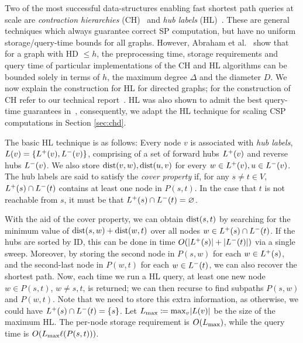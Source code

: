 Two of the most successful data-structures enabling fast shortest path queries at scale are \emph{contraction hierarchies} (CH)~\cite{geisberger_ch_definition} and \emph{hub labels} (HL)~\cite{cohen_definition_hl}.
These are general techniques which always guarantee correct SP computation, but have no uniform storage/query-time bounds for all graphs.
However, Abraham et al.~\cite{highway2013} show that for a graph with HD $\leq h$, the preprocessing time, storage requirements and query time of particular implementations of the CH and HL algorithms can be bounded solely in terms of $h$, the maximum degree $\Delta$ and the diameter $D$. 
We now explain the construction for HL for directed graphs; for the construction of CH refer to our technical report~\cite{TechReport}.
HL was also shown to admit the best query-time guarantees in~\cite{highway2013}, consequently, we adapt the HL technique for scaling CSP computations in Section \ref{sec:chd}.

The basic HL technique is as follows:
Every node $v$ is associated with \emph{hub labels}, $L(v) = \crl*{\Lf(v),\Lb(v)}$, comprising of a set of forward hubs $\Lf(v)$ and reverse hubs $\Lb(v)$.
We also store $\dist(v,w),\dist(u,v)$ for every $w\in\Lf(v),u\in\Lb(v)$.
The hub labels are said to satisfy the \emph{cover property} if, for any $s\neq t\in V$, $\Lf(s)\cap\Lb(t)$ contains at least one node in $P(s,t)$.
In the case that $t$ is not reachable from $s$, it must be that $\Lf(s)\cap\Lb(t)=\varnothing$.

With the aid of the cover property, we can obtain $\dist(s,t)$ by searching for the minimum value of $\dist(s,w)+\dist(w,t)$ over all nodes $w\in\Lf(s)\cap\Lb(t)$.
If the hubs are sorted by ID, this can be done in time $\Or(\card{\Lf(s)}+\card{\Lb(t)})$ via a single sweep.
Moreover, by storing the second node in $P(s,w)$ for each $w\in \Lf(s)$, and the second-last node in $P(w,t)$ for each $w\in \Lb(t)$, we can also recover the shortest path.
Now, each time we run a HL query, at least one new node $w\in P(s,t)$, $w\neq s,t$, is returned; we can then recurse to find subpaths $P(s,w)$ and $P(w,t)$.
Note that we need to store this extra information, as otherwise, we could have $\Lf(s)\cap\Lb(t)=\{s\}$.
Let $\Lm \defeq \max_v\abs*{L(v)}$ be the size of the maximum HL.
The per-node storage requirement is $\Or(\Lm)$, while the query time is $\Or(\Lm\ell(P(s,t)))$.

